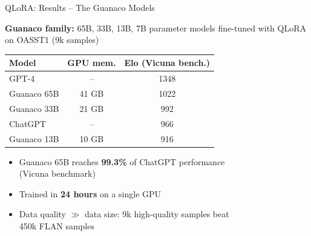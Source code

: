 \documentclass[11pt,compress,t,notes=noshow, xcolor=table]{beamer}
\begin{document}

\begin{frame}{QLoRA: Results -- The Guanaco Models}

\vfill

\textbf{Guanaco family:} 65B, 33B, 13B, 7B parameter models fine-tuned with QLoRA on OASST1 (9k samples)

\vfill

\begin{tabular}{lcc}
\hline
\textbf{Model} & \textbf{GPU mem.} & \textbf{Elo (Vicuna bench.)} \\
\hline
GPT-4 & -- & 1348 \\
\rowcolor{blue!10}
Guanaco 65B & 41 GB & 1022 \\
Guanaco 33B & 21 GB & 992 \\
ChatGPT & -- & 966 \\
Guanaco 13B & 10 GB & 916 \\
\hline
\end{tabular}

\vfill

\begin{itemize}
  \item Guanaco 65B reaches \textbf{99.3\%} of ChatGPT performance\\ (Vicuna benchmark)
  \item Trained in \textbf{24 hours} on a single GPU
  \item Data quality $\gg$ data size: 9k high-quality samples beat\\ 450k FLAN samples
\end{itemize}

\vfill

\end{frame}

\end{document}
